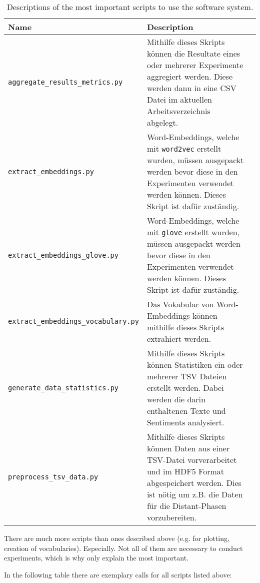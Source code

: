 \begin{table}[H]
	\centering
	\begin{adjustbox}{max width=\textwidth}
		\begin{tabular}{lp{8cm}p{8cm}}
			\toprule
			Name & Description\\ \midrule
			\texttt{aggregate{\_}results{\_}metrics.py} & Mithilfe dieses Skripts können die Resultate eines oder mehrerer Experimente aggregiert werden. Diese werden dann in eine CSV Datei im aktuellen Arbeitsverzeichnis abgelegt.\\
			\texttt{extract{\_}embeddings.py} & Word-Embeddings, welche mit \texttt{word2vec} erstellt wurden, müssen ausgepackt werden bevor diese in den Experimenten verwendet werden können. Dieses Skript ist dafür zuständig.\\
			\texttt{extract{\_}embeddings{\_}glove.py} & Word-Embeddings, welche mit \texttt{glove} erstellt wurden, müssen ausgepackt werden bevor diese in den Experimenten verwendet werden können. Dieses Skript ist dafür zuständig.\\
			\texttt{extract{\_}embeddings{\_}vocabulary.py} & Das Vokabular von Word-Embeddings können mithilfe dieses Skripts extrahiert werden.\\
			\texttt{generate{\_}data{\_}statistics.py} & Mithilfe dieses Skripts können Statistiken ein oder mehrerer TSV Dateien erstellt werden. Dabei werden die darin enthaltenen Texte und Sentiments analysiert.\\
			\texttt{preprocess{\_}tsv{\_}data.py} & Mithilfe dieses Skripts können Daten aus einer TSV-Datei vorverarbeitet und im HDF5 Format abgespeichert werden. Dies ist nötig um z.B. die Daten für die Distant-Phasen vorzubereiten.\\
			\bottomrule
		\end{tabular}
	\end{adjustbox}
	\caption{Descriptions of the most important scripts to use the software system.}
\end{table}

There are much more scripts than ones described above (e.g. for plotting, creation of vocabularies). Especially. Not all of them are necessary to conduct experiments, which is why only explain the most important.

In the following table there are exemplary calls for all scripts listed above:

